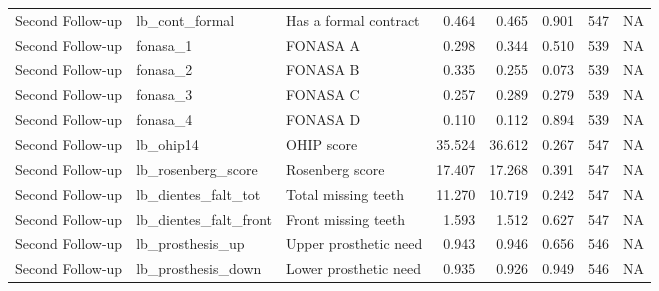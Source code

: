 \begin{table}
\begin{tabular}[t]{lllrrrrr}
Second Follow-up & lb\_cont\_formal & Has a formal contract & 0.464 & 0.465 & 0.901 & 547 & NA\\
Second Follow-up & fonasa\_1 & FONASA A & 0.298 & 0.344 & 0.510 & 539 & NA\\
Second Follow-up & fonasa\_2 & FONASA B & 0.335 & 0.255 & 0.073 & 539 & NA\\
Second Follow-up & fonasa\_3 & FONASA C & 0.257 & 0.289 & 0.279 & 539 & NA\\
\addlinespace
Second Follow-up & fonasa\_4 & FONASA D & 0.110 & 0.112 & 0.894 & 539 & NA\\
Second Follow-up & lb\_ohip14 & OHIP score & 35.524 & 36.612 & 0.267 & 547 & NA\\
Second Follow-up & lb\_rosenberg\_score & Rosenberg score & 17.407 & 17.268 & 0.391 & 547 & NA\\
Second Follow-up & lb\_dientes\_falt\_tot & Total missing teeth & 11.270 & 10.719 & 0.242 & 547 & NA\\
Second Follow-up & lb\_dientes\_falt\_front & Front missing teeth & 1.593 & 1.512 & 0.627 & 547 & NA\\
\addlinespace
Second Follow-up & lb\_prosthesis\_up & Upper prosthetic need & 0.943 & 0.946 & 0.656 & 546 & NA\\
Second Follow-up & lb\_prosthesis\_down & Lower prosthetic need & 0.935 & 0.926 & 0.949 & 546 & NA\\
\bottomrule
\end{tabular}
\end{table}
